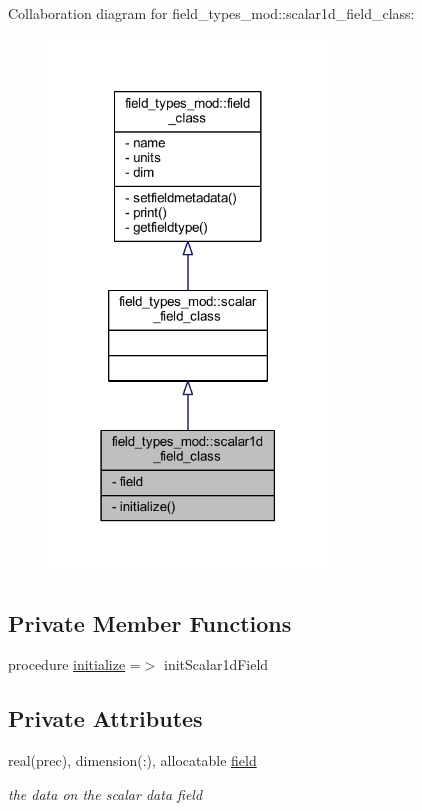 Collaboration diagram for field\+\_\+types\+\_\+mod\+:\+:scalar1d\+\_\+field\+\_\+class\+:\nopagebreak
\begin{figure}[H]
\begin{center}
\leavevmode
\includegraphics[width=210pt]{structfield__types__mod_1_1scalar1d__field__class__coll__graph}
\end{center}
\end{figure}
\subsection*{Private Member Functions}
\begin{DoxyCompactItemize}
\item 
procedure \mbox{\hyperlink{structfield__types__mod_1_1scalar1d__field__class_a5c7c27f2349aa8c3466ce6c4ed2bc5d0}{initialize}} =$>$ init\+Scalar1d\+Field
\end{DoxyCompactItemize}
\subsection*{Private Attributes}
\begin{DoxyCompactItemize}
\item 
real(prec), dimension(\+:), allocatable \mbox{\hyperlink{structfield__types__mod_1_1scalar1d__field__class_a826c1d64b3a7cd5c6a17834898741608}{field}}
\begin{DoxyCompactList}\small\item\em the data on the scalar data field \end{DoxyCompactList}\end{DoxyCompactItemize}


